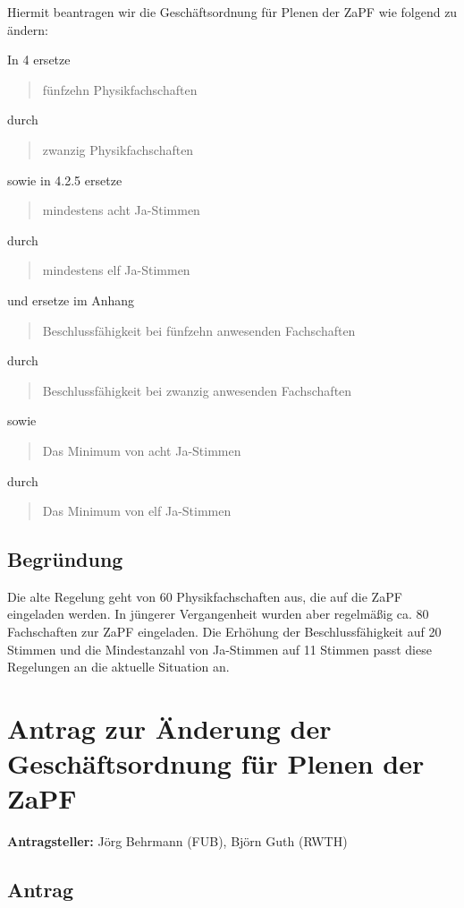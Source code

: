 \documentclass[draft,10pt,oneside]{scrartcl}
\begin{document}
Hiermit beantragen wir die Geschäftsordnung für Plenen der ZaPF wie folgend zu
ändern:

In 4 ersetze
\begin{quote}
	fünfzehn Physikfachschaften
\end{quote}
durch
\begin{quote}
	zwanzig Physikfachschaften
\end{quote}
sowie in 4.2.5 ersetze
\begin{quote}
	mindestens acht Ja-Stimmen
\end{quote}
durch
\begin{quote}
	mindestens elf Ja-Stimmen
\end{quote}
und ersetze im Anhang
\begin{quote}
	Beschlussfähigkeit bei fünfzehn anwesenden Fachschaften
\end{quote}
durch
\begin{quote}
	Beschlussfähigkeit bei zwanzig anwesenden Fachschaften
\end{quote}
sowie
\begin{quote}
	Das Minimum von acht Ja-Stimmen
\end{quote}
durch
\begin{quote}
	Das Minimum von elf Ja-Stimmen
\end{quote}

\subsection*{Begründung}
Die alte Regelung geht von 60 Physikfachschaften aus, die auf die ZaPF
eingeladen werden. In jüngerer Vergangenheit wurden aber regelmäßig ca. 80
Fachschaften zur ZaPF eingeladen. Die Erhöhung der Beschlussfähigkeit auf 20
Stimmen und die Mindestanzahl von Ja-Stimmen auf 11 Stimmen passt diese
Regelungen an die aktuelle Situation an.

\newpage

\section*{Antrag zur Änderung der Geschäftsordnung für Plenen der ZaPF}

\textbf{Antragsteller:} Jörg Behrmann (FUB), Björn Guth (RWTH)

\subsection*{Antrag}
\end{document}
